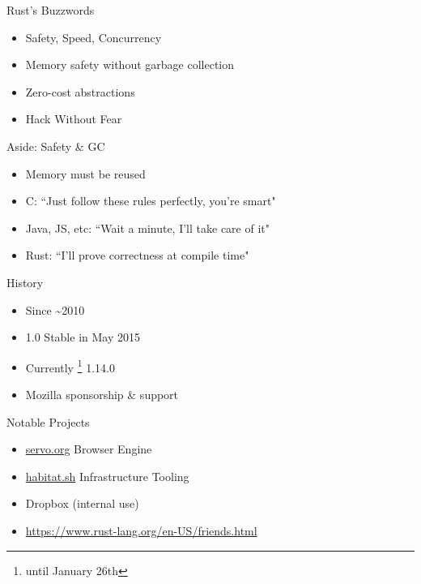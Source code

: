 \documentclass[50pt]{beamer}
\begin{document}
    \begin{frame}
        Rust's Buzzwords
        \begin{itemize}
            \item Safety, Speed, Concurrency
            \item Memory safety without garbage collection
            \item Zero-cost abstractions
            \item Hack Without Fear
        \end{itemize}
    \end{frame}

    \begin{frame}
        Aside: Safety \& GC
        \begin{itemize}
            \item Memory must be reused
            \item C: ``Just follow these rules perfectly, you're smart"
            \item Java, JS, etc: ``Wait a minute, I'll take care of it"
            \item Rust: ``I'll prove correctness at compile time"
        \end{itemize}
    \end{frame}

    \begin{frame}
        History
        \begin{itemize}
            \item Since \textasciitilde 2010
            \item 1.0 Stable in May 2015
            \item Currently \footnote{until January 26th} 1.14.0
            \item Mozilla sponsorship \& support
        \end{itemize}
    \end{frame}

    \begin{frame}
        Notable Projects
        \begin{itemize}
            \item \url{servo.org} Browser Engine
            \item \url{habitat.sh} Infrastructure Tooling
            \item Dropbox (internal use)
            \item \url{https://www.rust-lang.org/en-US/friends.html}
        \end{itemize}
    \end{frame}
\end{document}
